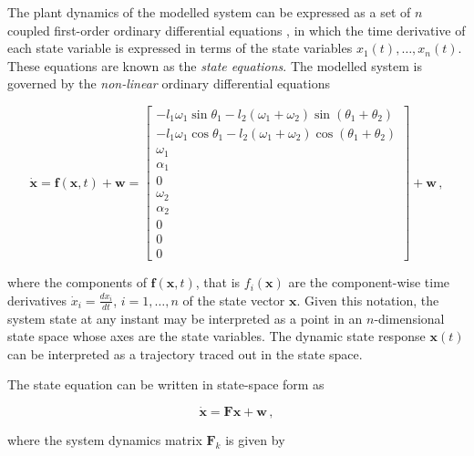 The plant dynamics of the modelled system can be expressed as a set of $n$ coupled first-order ordinary differential equations \cite{rowell2002state}, in which the time derivative of each state variable is expressed in terms of the state variables $x_1(t), \dots, x_n(t)$. These equations are known as the \emph{state equations}. The modelled system is governed by the \emph{non-linear} ordinary differential equations

\begin{equation} \label{eq:state_vector_derivative}
  \dot{\mathbf{x}} = \mathbf{f}(\mathbf{x}, t) + \mathbf{w} = \left[\begin{smallmatrix}
  -l_1 \omega_1 \sin \theta_1  - l_2 (\omega_1 + \omega_2) \sin(\theta_1 + \theta_2) \\
  -l_1 \omega_1 \cos \theta_1  - l_2 (\omega_1 + \omega_2) \cos(\theta_1 + \theta_2) \\ \omega_1 \\ \alpha_1 \\ 0 \\ \omega_2 \\ \alpha_2 \\ 0 \\ 0 \\ 0
  \end{smallmatrix}\right] + \mathbf{w}\,,
\end{equation}

\noindent
where the components of $\mathbf{f}(\mathbf{x},t)$, that is $f_i(\mathbf{x})$ are the component-wise time derivatives $\dot{x}_i = \frac{dx_i}{dt}$, $i = 1, \dots, n$ of the state vector $\mathbf{x}$. Given this notation, the system state at any instant may be interpreted as a point in an $n$-dimensional state space whose axes are the state variables. The dynamic state response $\mathbf{x}(t)$ can be interpreted as a trajectory traced out in the state space.

The state equation can be written in state-space form as 

\begin{equation}
  \dot{\mathbf{x}} = \mathbf{F} \mathbf{x} + \mathbf{w}\,,
\end{equation}

\noindent
where the system dynamics matrix $\mathbf{F}_k$ is given by


